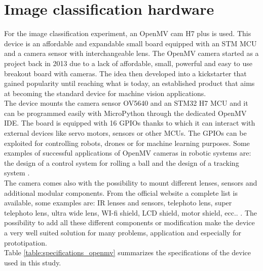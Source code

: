 \documentclass[12pt]{report}
\begin{document}
\section{Image classification hardware}
For the image classification experiment, an OpenMV cam H7 plus \autocite{abdelkader2017openmv} \autocite{openmv_web_page} is used. This device is an affordable and expandable small board equipped with an STM MCU and a camera sensor with interchangeable lens. The OpenMV camera started as a project \autocite{openmv_project} back in 2013 due to a lack of affordable, small, powerful and easy to use breakout board with cameras. The idea then developed into a kickstarter that gained popularity until reaching what is today, an established product that aims at becoming the standard device for machine vision applications. \\
The device mounts the camera sensor OV5640 and an STM32 H7 MCU and it can be programmed easily with MicroPython through the dedicated OpenMV IDE. The board is equipped with 16 GPIOs thanks to which it can interact with external devices like servo motors, sensors or other MCUs. The GPIOs can be exploited for controlling robots, drones or for machine learning purposes. Some examples of successful applications of OpenMV cameras in robotic systems are: the design of a control system for rolling a ball \autocite{zhou2019design} and the design of a tracking system \autocite{wei2020design}.\\
The camera comes also with the possibility to mount different lenses, sensors and additional modular components. From the official website a complete list is available, some examples are: IR lenses and sensors, telephoto lens, super telephoto lens, ultra wide lens, WI-fi shield, LCD shield, motor shield, ecc.. .
The possibility to add all these different components or modification make the device a very well suited solution for many problems, application and especially for prototipation.\\
Table \ref{table:specifications_openmv} summarizes the specifications of the device used in this study.\\
\end{document}
